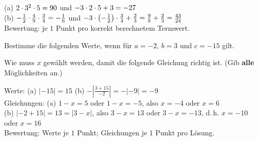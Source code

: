 \documentclass[11pt]{exam}
\begin{document}
\begin{questions}
{\begin{solution}
	(a) $2\cdot3^2\cdot5=90$ \quad und \quad $-3\cdot2\cdot5+3=-27$\\
	(b) $-\frac{1}{2}\cdot\frac{4}{9}\cdot\frac{3}{4}=-\frac{1}{6}$ \quad und \quad $-3\cdot\left(-\frac{1}{2}\right)\cdot\frac{3}{4}+\frac{2}{3}=\frac{9}{8}+\frac{2}{3}=\frac{43}{24}$\\
	Bewertung: je $1$ Punkt pro korrekt berechnetem Termwert.
\end{solution}}
{}

\question[6]
Bestimme die folgenden Werte, wenn für $a=-2$, $b=3$ und $c=-15$ gilt.
Wie muss $x$ gewählt werden, damit die folgende Gleichung richtig ist. (Gib \textbf{alle} Möglichkeiten an.)
{\begin{solution}
	Werte: (a) $\lvert -15\rvert=15$ \qquad (b) $-\left\lvert\frac{3+15}{-2}\right\rvert=-\lvert -9\rvert=-9$\\
	Gleichungen: (a) $1-x=5$ oder $1-x=-5$, also $x=-4$ oder $x=6$\\
	(b) $\lvert -2+15\rvert=13=\lvert 3-x\rvert$, also $3-x=13$ oder $3-x=-13$, d.\,h. $x=-10$ oder $x=16$\\
	Bewertung: Werte je $1$ Punkt; Gleichungen je $1$ Punkt pro Lösung.
\end{solution}}
{}




\end{questions}
\end{document}
